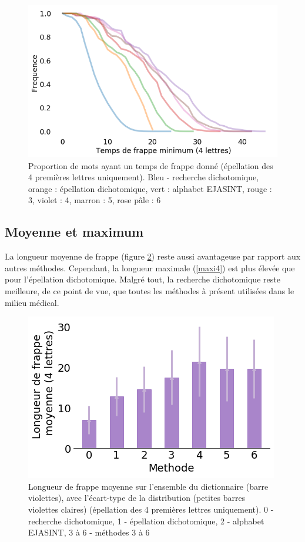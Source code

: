 \documentclass[twoside,twocolumn]{article}
\begin{document}
\begin{center}
\begin{figure}
  \includegraphics[scale=0.35]{frappe-mini4.png}
  \caption{Proportion de mots ayant un temps de frappe donné (épellation des 4 premières lettres uniquement). Bleu - recherche dichotomique, orange : épellation dichotomique, vert : alphabet EJASINT, rouge : 3, violet : 4, marron : 5, rose pâle : 6}
  \label{frappe-mini4}
\end{figure}
\end{center}

\subsection{Moyenne et maximum}

La longueur moyenne de frappe (figure \ref{mean4}) reste aussi avantageuse par rapport aux autres méthodes. Cependant, la longueur maximale (\ref{maxi4}) est plus élevée que pour l'épellation dichotomique. Malgré tout, la recherche dichotomique reste meilleure, de ce point de vue, que toutes les méthodes à présent utilisées dans le milieu médical.

\begin{center}
\begin{figure}
  \includegraphics[scale=0.5]{mean4.png}
  \caption{Longueur de frappe moyenne sur l'ensemble du dictionnaire (barre violettes), avec l'écart-type de la distribution (petites barres violettes claires) (épellation des 4 premières lettres uniquement). 0 - recherche dichotomique, 1 - épellation dichotomique, 2 - alphabet EJASINT, 3 à 6 - méthodes 3 à 6}
  \label{mean4}
\end{figure}
\end{center}
\end{document}
